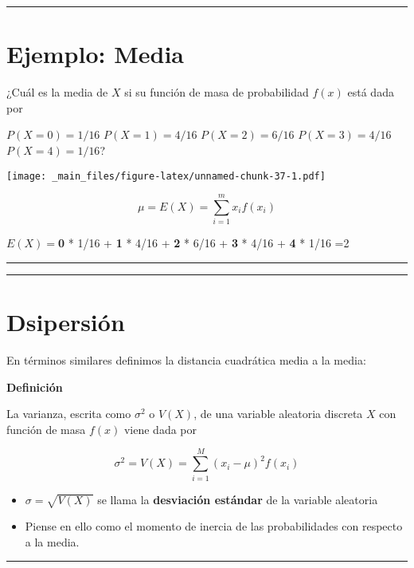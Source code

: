 \documentclass[
]{book}
\begin{document}
\begin{center}\rule{0.5\linewidth}{0.5pt}\end{center}

\hypertarget{ejemplo-media}{%
\section{Ejemplo: Media}\label{ejemplo-media}}

¿Cuál es la media de \(X\) si su función de masa de probabilidad \(f(x)\) está dada por

\(P(X=0)=1/16\)
\(P(X=1)=4/16\)
\(P(X=2)=6/16\)
\(P(X=3)=4/16\)
\(P(X=4)=1/16\)?

\texttt{[image: \_main\_files/figure-latex/unnamed-chunk-37-1.pdf]}

\[ \mu =E(X)=\sum_{i=1}^m x_i f(x_i) \]

\(E(X)=\)\textbf{0} * 1/16 + \textbf{1} * 4/16 + \textbf{2} * 6/16 + \textbf{3} * 4/16 + \textbf{4} * 1/16 =2

\begin{center}\rule{0.5\linewidth}{0.5pt}\end{center}

\begin{center}\rule{0.5\linewidth}{0.5pt}\end{center}

\hypertarget{dsipersiuxf3n}{%
\section{Dsipersión}\label{dsipersiuxf3n}}

En términos similares definimos la distancia cuadrática media a la media:

\textbf{Definición}

La varianza, escrita como \(\sigma^2\) o \(V(X)\), de una variable aleatoria discreta \(X\) con función de masa \(f(x)\) viene dada por

\[\sigma^2 = V(X)= \sum_{i=1}^M (x_i-\mu)^2 f(x_i)\]

\begin{itemize}
\item
  \(\sigma=\sqrt{V(X)}\) se llama la \textbf{desviación estándar} de la variable aleatoria
\item
  Piense en ello como el momento de inercia de las probabilidades con respecto a la media.
\end{itemize}

\begin{center}\rule{0.5\linewidth}{0.5pt}\end{center}
\end{document}
